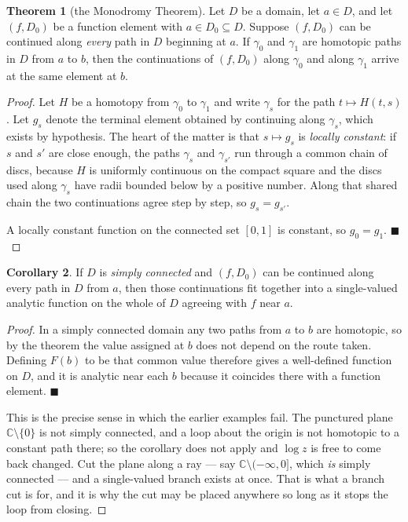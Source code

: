 \documentclass[11pt,a4paper]{article}
\theoremstyle{definition}
\newtheorem{thm}{Theorem}[section]
\newtheorem{corollary}[thm]{Corollary}
\begin{document}
\begin{thm}[the Monodromy Theorem]
Let $D$ be a domain, let $a \in D$, and let $(f, D_0)$ be a function element with
$a \in D_0 \subseteq D$. Suppose $(f, D_0)$ can be continued along
\emph{every} path in $D$ beginning at $a$. If $\gamma_0$ and $\gamma_1$ are
homotopic paths in $D$ from $a$ to $b$, then the continuations of $(f, D_0)$
along $\gamma_0$ and along $\gamma_1$ arrive at the same element at $b$.
\end{thm}

\begin{proof}
Let $H$ be a homotopy from $\gamma_0$ to $\gamma_1$ and write $\gamma_s$ for the
path $t \mapsto H(t,s)$. Let $g_s$ denote the terminal element obtained by
continuing along $\gamma_s$, which exists by hypothesis. The heart of the matter
is that $s \mapsto g_s$ is \emph{locally constant}: if $s$ and $s'$ are close
enough, the paths $\gamma_s$ and $\gamma_{s'}$ run through a common chain of
discs, because $H$ is uniformly continuous on the compact square and the discs
used along $\gamma_s$ have radii bounded below by a positive number. Along that
shared chain the two continuations agree step by step, so $g_s = g_{s'}$.

A locally constant function on the connected set $[0,1]$ is constant, so
$g_0 = g_1$. $\blacksquare$
\end{proof}

\begin{corollary}
If $D$ is \emph{simply connected} and $(f, D_0)$ can be continued along every
path in $D$ from $a$, then those continuations fit together into a single-valued
analytic function on the whole of $D$ agreeing with $f$ near $a$.
\end{corollary}

\begin{proof}
In a simply connected domain any two paths from $a$ to $b$ are homotopic, so by
the theorem the value assigned at $b$ does not depend on the route taken. Defining
$F(b)$ to be that common value therefore gives a well-defined function on $D$,
and it is analytic near each $b$ because it coincides there with a function
element. $\blacksquare$

This is the precise sense in which the earlier examples fail. The punctured plane
$\mathbb{C}\setminus\{0\}$ is not simply connected, and a loop about the origin is
not homotopic to a constant path there; so the corollary does not apply and
$\log z$ is free to come back changed. Cut the plane along a ray --- say
$\mathbb{C}\setminus(-\infty, 0]$, which \emph{is} simply connected --- and a
single-valued branch exists at once. That is what a branch cut is for, and it is
why the cut may be placed anywhere so long as it stops the loop from closing.
\end{proof}
\end{document}

